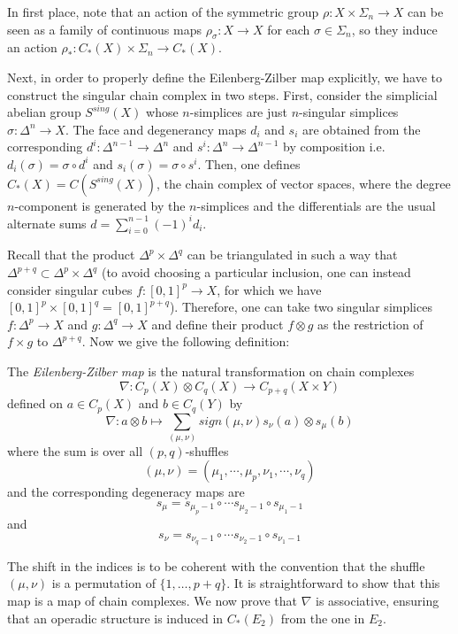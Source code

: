 \documentclass[TFM.tex]{subfiles}
\begin{document}
In first place, note that an action of the symmetric group $\rho:X\times\Sigma_n\to X$ can be seen as a family of continuous maps $\rho_\sigma:X\to X$ for each $\sigma\in\Sigma_n$, so they induce an action $\rho_*: C_*(X)\times\Sigma_n\to C_*(X)$. %

Next, in order to properly define the Eilenberg-Zilber map explicitly, we have to construct the singular chain complex in two steps. First, consider the simplicial abelian group $S^{sing}(X)$ whose $n$-simplices are just $n$-singular simplices $\sigma:\Delta^n\to X$. The face and degenerancy maps $d_i$ and $s_i$ are obtained from the corresponding $d^i:\Delta^{n-1}\to \Delta^{n}$ and $s^i:\Delta^n\to\Delta^{n-1}$ by composition i.e. $d_i(\sigma)=\sigma\circ d^i$ and $s_i(\sigma)=\sigma\circ s^i$. Then, one defines $C_*(X)=C(S^{sing}(X))$, the chain complex of vector spaces, where the degree $n$-component is generated by the $n$-simplices and the differentials are the usual alternate sums $d=\sum_{i=0}^{n-1}(-1)^id_i$. 

Recall that the product $\Delta^p\times\Delta^q$ can be triangulated in such a way that $\Delta^{p+q}\subset \Delta^p\times\Delta^q$ \cite{Hatcher} (to avoid choosing a particular inclusion, one can instead consider singular cubes $f:[0,1]^p\to X$, for which we have $[0,1]^p\times [0,1]^q=[0,1]^{p+q}$). Therefore, one can take two singular simplices $f:\Delta^p\to X$ and $g:\Delta^q\to X$ and define their product $f\otimes g$ as the restriction of $f\times g$ to $\Delta^{p+q}$. Now we give the following definition:

\begin{defi}
The \emph{Eilenberg-Zilber map} is the natural transformation on chain complexes
\[
\nabla :  C_p(X) \otimes C_q(X) \to C_{p+q}(X \times Y)
\]
defined on $a\in C_p(X)$ and $b\in C_q(Y)$ by 
\[
\nabla : a \otimes b \mapsto 
   \sum_{(\mu,\nu)} sign(\mu,\nu) s_\nu(a) \otimes s_\mu(b)
\]
where the sum is over all $(p,q)$-shuffles
\[
(\mu,\nu) = (\mu_1, \cdots, \mu_p, \nu_1, \cdots, \nu_q)
\]
and the corresponding degeneracy maps are
\[
s_{\mu} = s_{\mu_p - 1} \circ \cdots s_{\mu_2 - 1} \circ s_{\mu_1 - 1}
\]
and
\[
s_{\nu} = s_{\nu_q - 1} \circ \cdots s_{\nu_2 - 1} \circ s_{\nu_1 - 1}
\]
\end{defi}
The shift in the indices is to be coherent with the convention that the shuffle $(μ,ν)$ is a permutation of $\{1,\dots,p+q\}$. It is straightforward to show that this map is a map of chain complexes. We now prove that $\nabla$ is associative, ensuring that an operadic structure is induced in $C_*(E_2)$ from the one in $E_2$. 
\end{document}
